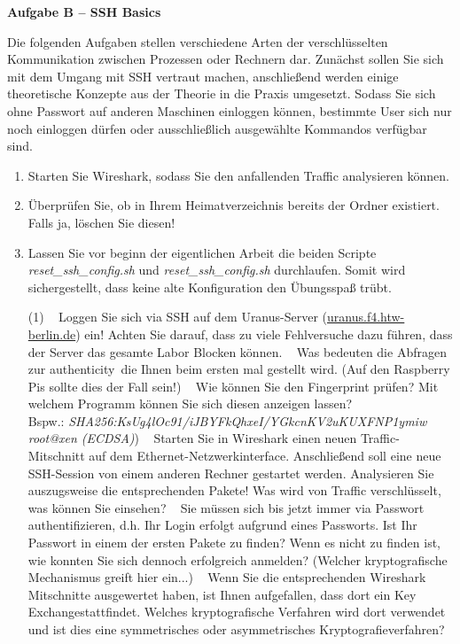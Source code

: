 \documentclass[paper=a4,fontsize=11pt]{scrartcl}%
\numberwithin{equation}{section}
\begin{document}
\begin{center}\Large{\textbf{Aufgabe B -- SSH Basics}}\end{center}\vskip0.25in
Die folgenden Aufgaben stellen verschiedene Arten der verschlüsselten Kommunikation zwischen Prozessen oder Rechnern dar. Zunächst sollen Sie sich mit dem Umgang mit SSH vertraut machen, anschließend werden einige theoretische Konzepte aus der Theorie in die Praxis umgesetzt. Sodass Sie sich ohne Passwort auf anderen Maschinen einloggen können, bestimmte User sich nur noch einloggen dürfen oder ausschließlich ausgewählte Kommandos verfügbar sind. 
\begin{enumerate}
\item Starten Sie Wireshark, sodass Sie den anfallenden Traffic analysieren können.
\item Überprüfen Sie, ob in Ihrem Heimatverzeichnis bereits der Ordner  existiert. Falls ja, löschen Sie diesen!
\item Lassen Sie vor beginn der eigentlichen Arbeit die beiden Scripte \emph{reset\_ssh\_config.sh} und \emph{reset\_ssh\_config.sh} durchlaufen. Somit wird sichergestellt, dass keine alte Konfiguration den Übungsspaß trübt. 
\begin{tasks}(1)
	\task~ Loggen Sie sich via SSH auf dem Uranus-Server (\url{uranus.f4.htw-berlin.de}) ein! Achten Sie darauf, dass zu viele Fehlversuche dazu führen, dass der Server das gesamte Labor Blocken können.
	\task~ Was bedeuten die Abfragen zur \glqq authenticity\grqq\ die Ihnen beim ersten mal gestellt wird. (Auf den Raspberry Pis sollte dies der Fall sein!)
	\task~ Wie können Sie den Fingerprint prüfen? Mit welchem Programm können Sie sich diesen anzeigen lassen?\\
	Bspw.: \small{ \emph{SHA256:KsUg4lOc91/iJBYFkQhxeI/YGkcnKV2uKUXFNP1ymiw root@xen (ECDSA)}})
	\task~ Starten Sie in Wireshark einen neuen Traffic-Mitschnitt auf dem Ethernet-Netzwerkinterface. Anschließend soll eine neue SSH-Session von einem anderen Rechner gestartet werden. Analysieren Sie auszugsweise die entsprechenden Pakete! Was wird von Traffic verschlüsselt, was können Sie einsehen? 
	\task~ Sie müssen sich bis jetzt immer via Passwort authentifizieren, d.h. Ihr Login erfolgt aufgrund eines Passworts. Ist Ihr Passwort in einem der ersten Pakete zu finden? Wenn es nicht zu finden ist, wie konnten Sie sich dennoch erfolgreich anmelden? (Welcher kryptografische Mechanismus greift hier ein...)
	\task~ Wenn Sie die entsprechenden Wireshark Mitschnitte ausgewertet haben, ist Ihnen aufgefallen, dass dort ein \glqq Key Exchange\grqq stattfindet. Welches kryptografische Verfahren wird dort verwendet und ist dies eine symmetrisches oder asymmetrisches Kryptografieverfahren?

\end{tasks}
\end{enumerate}
\end{document}
